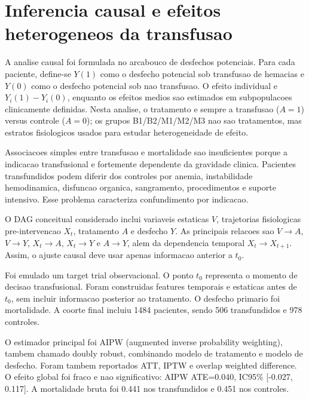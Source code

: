 \section{Inferencia causal e efeitos heterogeneos da transfusao}

A analise causal foi formulada no arcabouco de desfechos potenciais. Para cada paciente, define-se $Y(1)$ como o desfecho potencial sob transfusao de hemacias e $Y(0)$ como o desfecho potencial sob nao transfusao. O efeito individual e $Y_i(1)-Y_i(0)$, enquanto os efeitos medios sao estimados em subpopulacoes clinicamente definidas. Nesta analise, o tratamento e sempre a transfusao ($A=1$) versus controle ($A=0$); os grupos B1/B2/M1/M2/M3 nao sao tratamentos, mas estratos fisiologicos usados para estudar heterogeneidade de efeito.

Associacoes simples entre transfusao e mortalidade sao insuficientes porque a indicacao transfusional e fortemente dependente da gravidade clinica. Pacientes transfundidos podem diferir dos controles por anemia, instabilidade hemodinamica, disfuncao organica, sangramento, procedimentos e suporte intensivo. Esse problema caracteriza confundimento por indicacao.

O DAG conceitual considerado inclui variaveis estaticas $V$, trajetorias fisiologicas pre-intervencao $X_t$, tratamento $A$ e desfecho $Y$. As principais relacoes sao $V \rightarrow A$, $V \rightarrow Y$, $X_t \rightarrow A$, $X_t \rightarrow Y$ e $A \rightarrow Y$, alem da dependencia temporal $X_t \rightarrow X_{t+1}$. Assim, o ajuste causal deve usar apenas informacao anterior a $t_0$.

Foi emulado um target trial observacional. O ponto $t_0$ representa o momento de decisao transfusional. Foram construidas features temporais e estaticas antes de $t_0$, sem incluir informacao posterior ao tratamento. O desfecho primario foi mortalidade. A coorte final incluiu 1484 pacientes, sendo 506 transfundidos e 978 controles.

O estimador principal foi AIPW (augmented inverse probability weighting), tambem chamado doubly robust, combinando modelo de tratamento e modelo de desfecho. Foram tambem reportados ATT, IPTW e overlap weighted difference. O efeito global foi fraco e nao significativo: AIPW ATE=0.040, IC95\% [-0.027, 0.117]. A mortalidade bruta foi 0.441 nos transfundidos e 0.451 nos controles.

